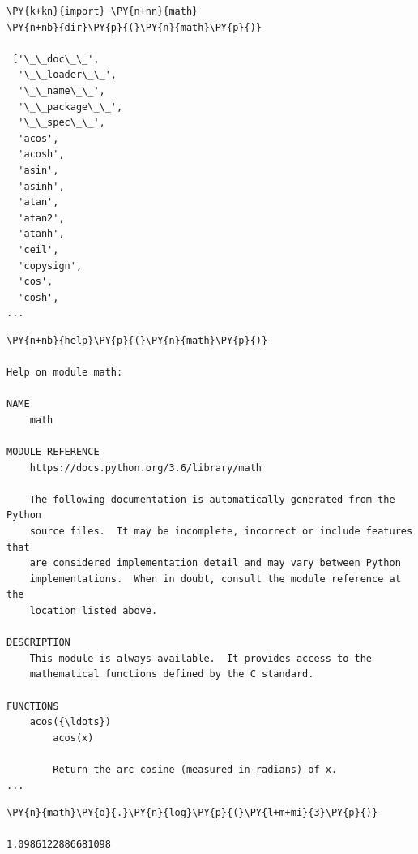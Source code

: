 \begin{tcolorbox}[breakable, size=fbox, boxrule=1pt, pad at break*=1mm, colback=cellbackground, colframe=cellborder]            
\begin{Verbatim}[commandchars=\\\{\}]
\PY{k+kn}{import} \PY{n+nn}{math}
\PY{n+nb}{dir}\PY{p}{(}\PY{n}{math}\PY{p}{)}

 ['\_\_doc\_\_',
  '\_\_loader\_\_',
  '\_\_name\_\_',
  '\_\_package\_\_',
  '\_\_spec\_\_',
  'acos',
  'acosh',
  'asin',
  'asinh',
  'atan',
  'atan2',
  'atanh',
  'ceil',
  'copysign',
  'cos',
  'cosh',
...
\end{Verbatim}
\end{tcolorbox}

\begin{tcolorbox}[breakable, size=fbox, boxrule=1pt, pad at break*=1mm, colback=cellbackground, colframe=cellborder]            
\begin{Verbatim}[commandchars=\\\{\}]
\PY{n+nb}{help}\PY{p}{(}\PY{n}{math}\PY{p}{)}

Help on module math:

NAME
    math

MODULE REFERENCE
    https://docs.python.org/3.6/library/math

    The following documentation is automatically generated from the Python
    source files.  It may be incomplete, incorrect or include features that
    are considered implementation detail and may vary between Python
    implementations.  When in doubt, consult the module reference at the
    location listed above.

DESCRIPTION
    This module is always available.  It provides access to the
    mathematical functions defined by the C standard.

FUNCTIONS
    acos({\ldots})
        acos(x)

        Return the arc cosine (measured in radians) of x.
...
\end{Verbatim}
\end{tcolorbox}

\begin{tcolorbox}[breakable, size=fbox, boxrule=1pt, pad at break*=1mm, colback=cellbackground, colframe=cellborder]            
\begin{Verbatim}[commandchars=\\\{\}]
\PY{n}{math}\PY{o}{.}\PY{n}{log}\PY{p}{(}\PY{l+m+mi}{3}\PY{p}{)}

1.0986122886681098
\end{Verbatim}
\end{tcolorbox}


